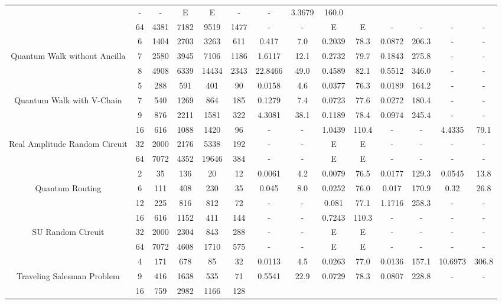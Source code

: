 \begin{table}[htb]
{\begin{tabular}{|c|c|c|c|c|c|c|c|c|c|c|c|c|c|}
 & - & -
 & E & E
 & - & -
 & 3.3679 & 160.0
 \\
 & 
64 & 4381 & 7182 & 9519 & 1477
 & - & -
 & E & E
 & - & -
 & - & -
 \\
\hline
 & 
6 & 1404 & 2703 & 3263 & 611
 & 0.417 & 7.0
 & 0.2039 & 78.3
 & 0.0872 & 206.3
 & - & -
 \\
Quantum Walk without Ancilla & 
7 & 2580 & 3945 & 7106 & 1186
 & 1.6117 & 12.1
 & 0.2732 & 79.7
 & 0.1843 & 275.8
 & - & -
 \\
 & 
8 & 4908 & 6339 & 14434 & 2343
 & 22.8466 & 49.0
 & 0.4589 & 82.1
 & 0.5512 & 346.0
 & - & -
 \\
\hline
 & 
5 & 288 & 591 & 401 & 90
 & 0.0158 & 4.6
 & 0.0377 & 76.3
 & 0.0189 & 164.2
 & - & -
 \\
Quantum Walk with V-Chain & 
7 & 540 & 1269 & 864 & 185
 & 0.1279 & 7.4
 & 0.0723 & 77.6
 & 0.0272 & 180.4
 & - & -
 \\
 & 
9 & 876 & 2211 & 1581 & 322
 & 4.3081 & 38.1
 & 0.1189 & 78.4
 & 0.0974 & 245.4
 & - & -
 \\
\hline
 & 
16 & 616 & 1088 & 1420 & 96
 & - & -
 & 1.0439 & 110.4
 & - & -
 & 4.4335 & 79.1
 \\
Real Amplitude Random Circuit & 
32 & 2000 & 2176 & 5338 & 192
 & - & -
 & E & E
 & - & -
 & - & -
 \\
 & 
64 & 7072 & 4352 & 19646 & 384
 & - & -
 & E & E
 & - & -
 & - & -
 \\
\hline
 & 
2 & 35 & 136 & 20 & 12
 & 0.0061 & 4.2
 & 0.0079 & 76.5
 & 0.0177 & 129.3
 & 0.0545 & 13.8
 \\
Quantum Routing & 
6 & 111 & 408 & 230 & 35
 & 0.045 & 8.0
 & 0.0252 & 76.0
 & 0.017 & 170.9
 & 0.32 & 26.8
 \\
 & 
12 & 225 & 816 & 812 & 72
 & - & -
 & 0.081 & 77.1
 & 1.1716 & 258.3
 & - & -
 \\
\hline
 & 
16 & 616 & 1152 & 411 & 144
 & - & -
 & 0.7243 & 110.3
 & - & -
 & - & -
 \\
SU Random Circuit & 
32 & 2000 & 2304 & 843 & 288
 & - & -
 & E & E
 & - & -
 & - & -
 \\
 & 
64 & 7072 & 4608 & 1710 & 575
 & - & -
 & E & E
 & - & -
 & - & -
 \\
\hline
 & 
4 & 171 & 678 & 85 & 32
 & 0.0113 & 4.5
 & 0.0263 & 77.0
 & 0.0136 & 157.1
 & 10.6973 & 306.8
 \\
Traveling Salesman Problem & 
9 & 416 & 1638 & 535 & 71
 & 0.5541 & 22.9
 & 0.0729 & 78.3
 & 0.0807 & 228.8
 & - & -
 \\
 & 
16 & 759 & 2982 & 1166 & 128

\end{tabular}}
\end{table}
